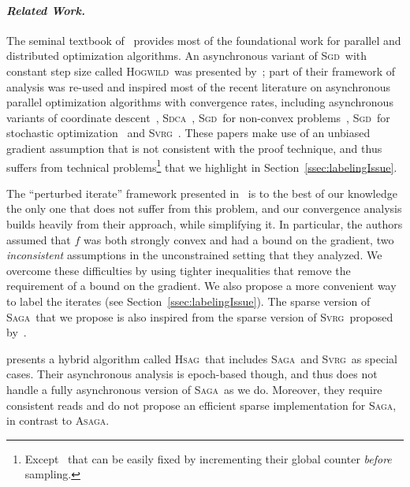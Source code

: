 \documentclass[twoside, 11pt]{article}
\newcommand{\ASAGA}{\textsc{Asaga}}
\newcommand{\SAGA}{\textsc{Saga}}
\newcommand{\SVRG}{\textsc{Svrg}}
\newcommand{\Hogwild}{\textsc{Hogwild}}
\newcommand{\SDCA}{\textsc{Sdca}}
\newcommand{\SGD}{\textsc{Sgd}}
\newcommand{\HSAG}{\textsc{Hsag}}
\begin{document}
\paragraph{\textit{Related Work.}}
The seminal textbook of~\citet{bertsekasParalle1989} provides most of the foundational work for parallel and distributed optimization algorithms.
An asynchronous variant of \SGD\ with constant step size called \Hogwild\ was presented by~\citet{hogwild}; part of their framework of analysis was re-used and inspired most of the recent literature on asynchronous parallel optimization algorithms with convergence rates, including asynchronous variants of coordinate descent~\citep{asyncCD2015}, \SDCA~\citep{asyncSDCA2015}, \SGD\ for non-convex problems~\citep{taming,asyncSGDNonConvex2015}, \SGD\ for stochastic optimization~\citep{duchi} and \SVRG~\citep{smola,asySVRG}.
These papers make use of an unbiased gradient assumption that is not consistent with the proof technique, and thus suffers from technical problems\footnote{Except~\citep{duchi} that can be easily fixed by incrementing their global counter \emph{before} sampling.} that we highlight in Section~\ref{ssec:labelingIssue}.

The ``perturbed iterate'' framework presented in~\citet{mania} is to the best of our knowledge the only one that does not suffer from this problem, and our convergence analysis builds heavily from their approach, while simplifying it.
In particular, the authors assumed that $f$ was both strongly convex and had a bound on the gradient, two \emph{inconsistent} assumptions in the unconstrained setting that they analyzed.
We overcome these difficulties by using tighter inequalities that remove the requirement of a bound on the gradient. We also propose a more convenient way to label the iterates (see Section~\ref{ssec:labelingIssue}).
The sparse version of \SAGA\ that we propose is also inspired from the sparse version of \SVRG\ proposed by~\citet{mania}.

\citet{smola} presents a hybrid algorithm called \HSAG\ that includes \SAGA\ and \SVRG\ as special cases.
Their asynchronous analysis is epoch-based though, and thus does not handle a fully asynchronous version of \SAGA\ as we do.
Moreover, they require consistent reads and do not propose an efficient sparse implementation for \SAGA, in contrast to \ASAGA.
\end{document}
